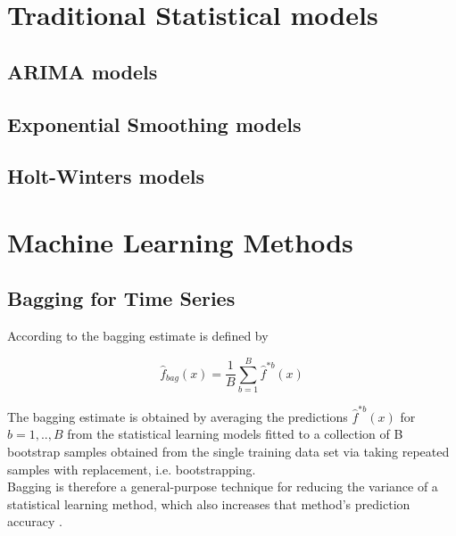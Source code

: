 \section{Traditional Statistical models}

\subsection{ARIMA models}

\subsection{Exponential Smoothing models}

\subsection{Holt-Winters models}

\section{Machine Learning Methods}

\subsection{Bagging for Time Series}

According to \textcite{hastie2009} the bagging estimate is defined by

\begin{equation} \label{eq: bagging}
\hat{f}_{bag}(x)=\frac{1}{B} \sum_{b=1}^B\hat{f}^{*b}(x)
\end{equation}

\noindent The bagging estimate is obtained by averaging the predictions $\hat{f}^{*b}(x)$ for\\ $ b=1,..,B $ from the statistical learning models fitted to a collection of B bootstrap samples obtained from the single training data set via taking repeated samples with replacement, i.e. bootstrapping.\\
Bagging is therefore a general-purpose technique for reducing the variance of a statistical learning method, which also increases that method's prediction accuracy \citep{james2013}.\\

